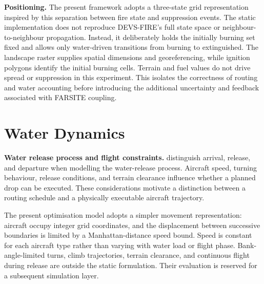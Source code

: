 \textbf{Positioning.} The present framework adopts a three-state grid representation inspired by this separation between fire state and suppression events. The static implementation does not reproduce DEVS-FIRE's full state space or neighbour-to-neighbour propagation. Instead, it deliberately holds the initially burning set fixed and allows only water-driven transitions from burning to extinguished. The landscape raster supplies spatial dimensions and georeferencing, while ignition polygons identify the initial burning cells. Terrain and fuel values do not drive spread or suppression in this experiment. This isolates the correctness of routing and water accounting before introducing the additional uncertainty and feedback associated with FARSITE coupling.

\section{Water Dynamics}
\label{sec:lit-water-dynamics}

\textbf{Water release process and flight constraints.} \citet{liu2025hierarchical} distinguish arrival, release, and departure when modelling the water-release process. Aircraft speed, turning behaviour, release conditions, and terrain clearance influence whether a planned drop can be executed. These considerations motivate a distinction between a routing schedule and a physically executable aircraft trajectory.

The present optimisation model adopts a simpler movement representation: aircraft occupy integer grid coordinates, and the displacement between successive boundaries is limited by a Manhattan-distance speed bound. Speed is constant for each aircraft type rather than varying with water load or flight phase. Bank-angle-limited turns, climb trajectories, terrain clearance, and continuous flight during release are outside the static formulation. Their evaluation is reserved for a subsequent simulation layer.

